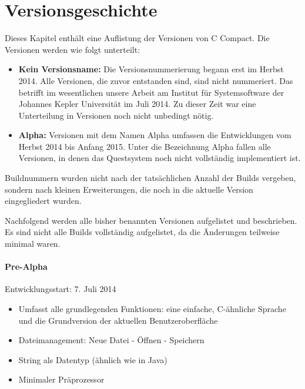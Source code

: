 

\chapter{Versionsgeschichte}
Dieses Kapitel enthält eine Auflistung der Versionen von C Compact. Die Versionen werden wie folgt unterteilt:
\begin{itemize}
\item \textbf{Kein Versionsname:} Die Versionsnummerierung begann erst im Herbst 2014. Alle Versionen, die zuvor entstanden sind, sind nicht nummeriert. Das betrifft im wesentlichen unsere Arbeit am Institut für Systemsoftware der Johannes Kepler Universität im Juli 2014. Zu dieser Zeit war eine Unterteilung in Versionen noch nicht unbedingt nötig.
\item \textbf{Alpha:} Versionen mit dem Namen Alpha umfassen die Entwicklungen vom Herbst 2014 bis Anfang 2015. Unter die Bezeichnung Alpha fallen alle Versionen, in denen das Questsystem noch nicht vollständig implementiert ist.
\end{itemize}

Buildnummern wurden nicht nach der tatsächlichen Anzahl der Builds vergeben, sondern nach kleinen Erweiterungen, die noch in die aktuelle Version eingegliedert wurden.

Nachfolgend werden alle bisher benannten Versionen aufgelistet und beschrieben. Es sind nicht alle Builds vollständig aufgelistet, da die Änderungen teilweise minimal waren.

\subsubsection*{Pre-Alpha}
Entwicklungsstart: 7. Juli 2014
\begin{itemize}
\item Umfasst alle grundlegenden Funktionen: eine einfache, C-ähnliche Sprache und die Grundversion der aktuellen Benutzeroberfläche
\item Dateimanagement: Neue Datei - Öffnen - Speichern
\item String als Datentyp (ähnlich wie in Java)
\item Minimaler Präprozessor
\end{itemize}


